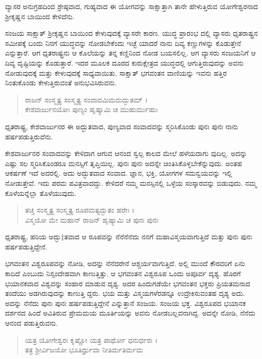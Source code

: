 {\small ವ್ಯಾಸರ ಅನುಗ್ರಹದಿಂದ ಶ್ರೇಷ್ಠವಾದ, ಗುಹ್ಯವಾದ ಈ ಯೋಗವನ್ನು ಸಾಕ್ಷಾತ್ತಾಗಿ ತಾನೇ ಹೇಳುತ್ತಿರುವ ಯೋಗೇಶ್ವರನಾದ ಶ್ರೀಕೃಷ್ಣನ ಬಾಯಿಂದ ಕೇಳಿದೆನು.}

ಸಂಜಯ ಸಾಕ್ಷಾತ್ ಶ್ರೀಕೃಷ್ಣನ ಬಾಯಿಂದ ಕೇಳುವುದಕ್ಕೆ ವ್ಯಾಸರೇ ಕಾರಣ. ಯುದ್ಧ ಪ್ರಾರಂಭ ದಲ್ಲಿ ವ್ಯಾಸರು ಧೃತರಾಷ್ಟ್ರನ ಸಮೀಪಕ್ಕೆ ಬಂದು ನಿನಗೆ ಯುದ್ಧವನ್ನು ನೋಡಬೇಕೆಂದು ಇಚ್ಛೆ ಯಾದರೆ ನಾನು ದಿವ್ಯ ಕಣ್ಣುಗಳನ್ನು ಕೊಡುತ್ತೇನೆ ಎನ್ನುತ್ತಾರೆ. ಆಗ ಧೃತರಾಷ್ಟ್ರನು ಆ ಕೊಲೆಯನ್ನು ತನ್ನ ಕಣ್ಣಿನಿಂದ ನೋಡ ಬಯಸಲಿಲ್ಲ. ಆಗ ವ್ಯಾಸರು ಸಂಜಯನಿಗೆ ಆ ದಿವ್ಯ ದೃಷ್ಟಿಯನ್ನು ಕೊಡುತ್ತಾರೆ. ಇದರ ಮೂಲಕ ದೂರದ ಕುರುಕ್ಷೇತ್ರದ ಯುದ್ಧದಲ್ಲಿ ಆಗುತ್ತಿರುವುದನ್ನು ಅವನು ನೋಡುವುದಕ್ಕೆ ಮತ್ತು ಕೇಳುವುದಕ್ಕೆ ಸಾಧ್ಯವಾಯಿತು. ಸಾಕ್ಷಾತ್ ಭಗವಂತನ ವಾಣಿಯನ್ನು ಇವನು ಹತ್ತಿರ ನಿಂತುಕೊಂಡು ಕೇಳುತ್ತಿರುವಂತೆ ಅನುಭವಿಸಿರುವನು.

\begin{verse}
ರಾಜನ್ ಸಂಸ್ಮೃತ್ಯ ಸಂಸ್ಮೃತ್ಯ ಸಂವಾದಮಿಮಮದ್ಭುತಮ್ ।\\ಕೇಶವಾರ್ಜುನಯೋಃ ಪುಣ್ಯಂ ಹೃಷ್ಯಾಮಿ ಚ ಮುಹುರ್ಮುಹುಃ 
\end{verse}

{\small ಧೃತರಾಷ್ಟ್ರ, ಕೇಶವಾರ್ಜುನರ ಈ ಅದ್ಭುತವಾದ, ಪುಣ್ಯವಾದ ಸಂವಾದವನ್ನು ಸ್ಮರಿಸಿಕೊಂಡು ಪುನಃ ಪುನಃ ನಾನು ಹರ್ಷಪಡುತ್ತಿರುವೆನು.}

ಕೇಶವಾರ್ಜುನರ ಸಂವಾದವನ್ನು ಕೇಳಿದಾಗ ಆಗುವ ಆನಂದ ಸ್ವಲ್ಪ ಕಾಲದ ಮೇಲೆ ಹಳೆಯದಾಗು ವುದಿಲ್ಲ. ಅದನ್ನು ಎಷ್ಟು ಸಲ ಸ್ಮರಿಸಿಕೊಂಡರೂ ಮನಸ್ಸಿಗೆ ತೃಪ್ತಿಯಿಲ್ಲ. ಪುನಃ ಪುನಃ ಅದನ್ನೇ ಚಿಂತಿಸಿಕೊಳ್ಳಬೇಕೆನ್ನುವುದು. ಅಂತಹ ಆಕರ್ಷಣೆ ಇದೆ ಅದರಲ್ಲಿ. ಅದು ಅದ್ಭುತವಾದ ಸಂವಾದ. ಜ್ಞಾನ, ಭಕ್ತಿ, ಯೋಗಗಳ ಸಮನ್ವಯವನ್ನು ಇಲ್ಲಿ ನೋಡುತ್ತೇವೆ. ಇದು ಪರಮ ಪವಿತ್ರವಾದದ್ದು. ಕೇಳಿದರೆ ನಮ್ಮ ಮನಸ್ಸಿನಲ್ಲಿ ಒಳ್ಳೆಯ ಸಂಸ್ಕಾರವನ್ನು ಬಿಡುವುದು. ನಮ್ಮ ಕೊಳೆಯನ್ನೆಲ್ಲಾ ತೊಳೆಯುವುದು.

\begin{verse}
ತಚ್ಚ ಸಂಸ್ಮೃತ್ಯ ಸಂಸ್ಮೃತ್ಯ ರೂಪಮತ್ಯದ್ಭುತಂ ಹರೇಃ ।\\ವಿಸ್ಮಯೋ ಮೇ ಮಹಾನ್ ರಾಜನ್ ಹೃಷ್ಯಾಮಿ ಚ ಪುನಃ ಪುನಃ 
\end{verse}

{\small ಧೃತರಾಷ್ಟ್ರ, ಹರಿಯ ಅದ್ಭು‡ತವಾದ ಆ ರೂಪವನ್ನು ನೆನೆನೆನೆದು ನನಗೆ ಮಹಾವಿಸ್ಮಯವಾಗುತ್ತಿದೆ ಮತ್ತು ಪುನಃ ಪುನಃ ಹರ್ಷಪಡುತ್ತಿದ್ದೇನೆ.}

ಭಗವಂತನ ವಿಶ್ವರೂಪವನ್ನು ನೋಡಿ, ಅದನ್ನು ನೆನೆದರೇನೆ ಆಶ್ಚರ್ಯವಾಗುತ್ತಿದೆ. ಅಲ್ಲಿ ಮುಂದೆ ಕೌರವರಿಗೆ ಏನು ಕಾದಿದೆ ಎಂಬುದು ನಿಸ್ಸಂದೇಹವಾಗಿ ಕಾಣುತ್ತಿತ್ತು. ಆ ಭಗವಂತನ ವಿಶ್ವರೂಪ ಒಂದು ಅಪೂರ್ವ ದೃಶ್ಯ. ಹೊರಗೆ ಭಯಾನಕವಾದ ವಿಶ್ವವನ್ನು ಸಂಹಾರ ಮಾಡುವ ದೃಶ್ಯ. ಅದರ ಹಿಂದುಗಡೆಯೇ ಭಗವಂತನ ಭಕ್ತರು ಪ್ರಿಯತಮನಾದ ತಂದೆಯು ಅಡಗಿರುವುದನ್ನು ಕಾಣುತ್ತಿ ದ್ದರು. ಭಯ ಮತ್ತು ವಿಸ್ಮಯಗಳೆರಡನ್ನೂ ಉದ್ರೇಕಿಸುವಂತಹ ದೃಶ್ಯ ಅದು. ಅದನ್ನು ನೆನೆದು ಪುನಃ ಪುನಃ ಹರ್ಷಪಡುತ್ತಿದ್ದೇನೆ ಎನ್ನುತ್ತಾನೆ ಸಂಜಯ. ಸಂಜಯ ಭಕ್ತ. ವಿಶ್ವರೂಪದ ಭಯಾನಕ ದರ್ಶನದ ಹಿಂದೆ ಅವಿತಿರುವ ಪ್ರೇಮಮಯ ಮೂರ್ತಿಯನ್ನು ಅವನು ನೋಡಬಲ್ಲವನಾಗಿದ್ದ. ಅದನ್ನೇ ನೋಡಿ, ನೆನೆದು ಆನಂದ ಪಡುತ್ತಿರುವನು.

\begin{verse}
ಯತ್ರ ಯೋಗೇಶ್ವರಃ ಕೃಷ್ಣೋ ಯತ್ರ ಪಾರ್ಥೋ ಧನುರ್ಧರಃ ।\\ತತ್ರ ಶ್ರೀರ್ವಿಜಯೋ ಭೂತಿರ್ಧ್ರುವಾ ನೀತಿರ್ಮತಿರ್ಮಮ 
\end{verse}

